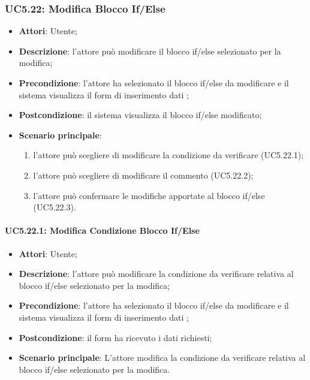 \subsubsection{UC5.22: Modifica Blocco If/Else}
\label{UC5.22}
\begin{itemize}
	\item \textbf{Attori}: Utente;
	\item \textbf{Descrizione}: l'attore può modificare il blocco if/else selezionato per la modifica;
	\item \textbf{Precondizione}: l'attore ha selezionato il blocco if/else da modificare e il sistema visualizza il form di inserimento dati ;
	\item \textbf{Postcondizione}: il sistema visualizza il blocco if/else modificato;
	\item \textbf{Scenario principale}:
	\begin{enumerate}
		\item l'attore può scegliere di modificare la condizione da verificare (UC5.22.1);
		\item l'attore può scegliere di modificare il commento (UC5.22.2);
		\item l'attore può confermare le modifiche apportate al blocco if/else (UC5.22.3).
	\end{enumerate}
\end{itemize}

\paragraph{UC5.22.1: Modifica Condizione Blocco If/Else}
\label{UC5.22.1}
\begin{itemize}
	\item \textbf{Attori}: Utente;
	\item \textbf{Descrizione}: l'attore può modificare la condizione da verificare relativa al blocco if/else selezionato per la modifica;
	\item \textbf{Precondizione}: l'attore ha selezionato il blocco if/else da modificare e il sistema visualizza il form di inserimento dati ;
	\item \textbf{Postcondizione}: il form ha ricevuto i dati richiesti;
	\item \textbf{Scenario principale}: L'attore modifica la condizione da verificare relativa al blocco if/else selezionato per la modifica.
\end{itemize}

